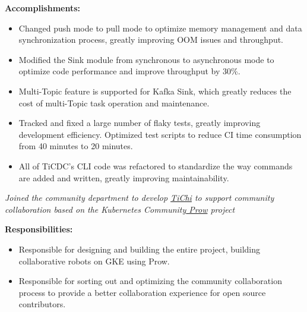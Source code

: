 \documentclass{resume}
\newcommand{\en}[1]{#1}
\newcommand{\zh}[1]{}
\begin{document}
\en{\textbf{Accomplishments:}}
\zh{\textbf{产出：}}
\begin{itemize}
      \item \en{Changed push mode to pull mode to optimize memory management and data synchronization process, greatly improving OOM issues and throughput.}
            \zh{将推送模式修改为了拉取模式优化了内存管理和数据同步流程，极大的改善了 OOM 问题和吞吐。}
      \item \en{Modified the Sink module from synchronous to asynchronous mode to optimize code performance and improve throughput by 30\%.}
            \zh{将 Sink 模块从同步模式修改为异步模式，优化代码性能，将吞吐提升 30\%。}
      \item \en{Multi-Topic feature is supported for Kafka Sink, which greatly reduces the cost of multi-Topic task operation and maintenance.}
            \zh{为 Kafka Sink 支持了多 Topic 功能，极大的降低了多 Topic 的任务运维成本。}
      \item \en{Tracked and fixed a large number of flaky tests, greatly improving development efficiency. Optimized test scripts to reduce CI time consumption from 40 minutes to 20 minutes.}
            \zh{追踪和修复大量不稳定测试，极大的提升了开发效率。优化了测试脚本，将 CI 时间消耗从 40 分钟降低至 20 分钟。}
      \item \en{All of TiCDC's CLI code was refactored to standardize the way commands are added and written, greatly improving maintainability.}
            \zh{重构了 TiCDC 的 CLI 所有代码，标准化了命令添加和编写方式，极大提升了可维护性。}
\end{itemize}
\en{}
\zh{\datedsubsection{\textbf{\href{https://pingcap.com/zh/}{PingCAP Inc. - 数据库 - 前后端开发工程师}}}{2020/08 -- 2021/07}}
\en{\textsl{Joined the community department to develop {\href{https://github.com/ti-community-infra/tichi}{TiChi}} to support community collaboration based on the Kubernetes Community{\href{https://github.com/kubernetes/test-infra/tree/master/prow}{ Prow}} project}}
\zh{\textsl{加入了社区部门，以 Kubernetes 社区{\href{https://github.com/kubernetes/test-infra/tree/master/prow}{ Prow}} 项目为基础开发{\href{https://github.com/ti-community-infra/tichi}{ TiChi}} 来支撑社区协作}}

\en{\textbf{Responsibilities:}}
\zh{\textbf{职责：}}
\begin{itemize}
      \item \en{Responsible for designing and building the entire project, building collaborative robots on GKE using Prow.}
            \zh{负责从零开始设计和构建整个项目，使用 Prow 在 GKE 上搭建协作机器人。}
      \item \en{Responsible for sorting out and optimizing the community collaboration process to provide a better collaboration experience for open source contributors.}
            \zh{负责社区协作流程的梳理和优化，为开源贡献者提供更好的协作体验。}
\end{itemize}
\end{document}
